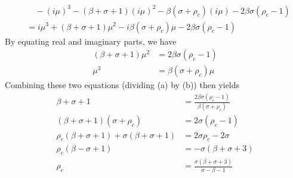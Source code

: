 \begin{align}
&\quad -(i\mu)^3 - (\beta + \sigma + 1)(i\mu)^2 -\beta(\sigma + \rho_c)(i\mu) - 2 \beta\sigma(\rho_c - 1) \nonumber \\
&= i\mu^3 + (\beta + \sigma + 1)\mu^2 -i\beta(\sigma + \rho_c)\mu - 2 \beta\sigma(\rho_c - 1)
\end{align}
By equating real and imaginary parts, we have
\begin{subequations}
\begin{align}
(\beta + \sigma + 1)\mu^2 &= 2 \beta\sigma(\rho_c - 1) \\
\mu^3 &= \beta(\sigma + \rho_c)\mu 
\end{align}    
\end{subequations}
Combining these two equations (dividing (a) by (b)) then yields
\begin{align}
\beta + \sigma + 1 &= \frac{2 \beta\sigma(\rho_c - 1)}{\beta(\sigma + \rho_c)} \nonumber \\
(\beta + \sigma + 1)(\sigma + \rho_c) &= 2 \sigma(\rho_c - 1) \nonumber \\
\rho_c(\beta + \sigma + 1) + \sigma(\beta + \sigma + 1) &= 2 \sigma\rho_c - 2\sigma  \nonumber \\
\rho_c(\beta - \sigma + 1) &= -\sigma(\beta + \sigma + 3)  \nonumber \\
\rho_c &= \frac{\sigma(\beta + \sigma + 3)}{\sigma - \beta - 1} \label{eqn:lorezncrit}
\end{align}
